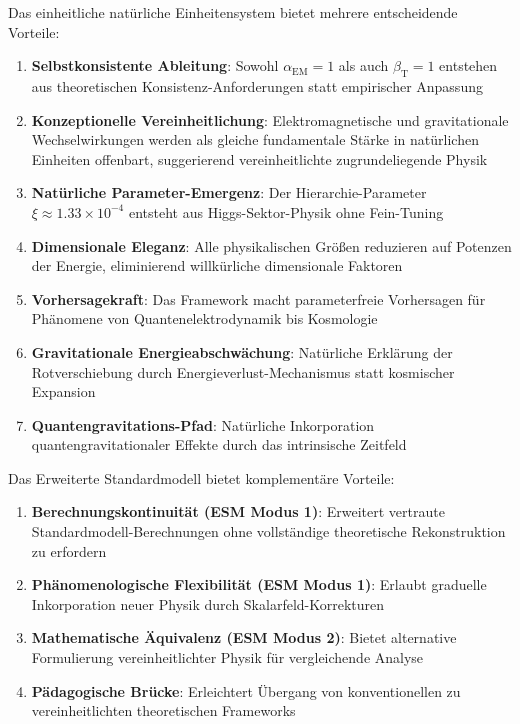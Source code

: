 \documentclass[12pt,a4paper]{article}
\newcommand{\alphaEM}{\alpha_{\text{EM}}}
\newcommand{\betaT}{\beta_{\text{T}}}
\newcommand{\xipar}{\xi}
\begin{document}
	Das einheitliche natürliche Einheitensystem bietet mehrere entscheidende Vorteile:
	
	\begin{enumerate}
		\item \textbf{Selbstkonsistente Ableitung}: Sowohl $\alphaEM = 1$ als auch $\betaT = 1$ entstehen aus theoretischen Konsistenz-Anforderungen statt empirischer Anpassung
		
		\item \textbf{Konzeptionelle Vereinheitlichung}: Elektromagnetische und gravitationale Wechselwirkungen werden als gleiche fundamentale Stärke in natürlichen Einheiten offenbart, suggerierend vereinheitlichte zugrundeliegende Physik
		
		\item \textbf{Natürliche Parameter-Emergenz}: Der Hierarchie-Parameter $\xipar \approx 1.33 \times 10^{-4}$ entsteht aus Higgs-Sektor-Physik ohne Fein-Tuning
		
		\item \textbf{Dimensionale Eleganz}: Alle physikalischen Größen reduzieren auf Potenzen der Energie, eliminierend willkürliche dimensionale Faktoren
		
		\item \textbf{Vorhersagekraft}: Das Framework macht parameterfreie Vorhersagen für Phänomene von Quantenelektrodynamik bis Kosmologie
		
		\item \textbf{Gravitationale Energieabschwächung}: Natürliche Erklärung der Rotverschiebung durch Energieverlust-Mechanismus statt kosmischer Expansion
		
		\item \textbf{Quantengravitations-Pfad}: Natürliche Inkorporation quantengravitationaler Effekte durch das intrinsische Zeitfeld
	\end{enumerate}
	
	Das Erweiterte Standardmodell bietet komplementäre Vorteile:
	
	\begin{enumerate}
		\item \textbf{Berechnungskontinuität (ESM Modus 1)}: Erweitert vertraute Standardmodell-Berechnungen ohne vollständige theoretische Rekonstruktion zu erfordern
		
		\item \textbf{Phänomenologische Flexibilität (ESM Modus 1)}: Erlaubt graduelle Inkorporation neuer Physik durch Skalarfeld-Korrekturen
		
		\item \textbf{Mathematische Äquivalenz (ESM Modus 2)}: Bietet alternative Formulierung vereinheitlichter Physik für vergleichende Analyse
		
		\item \textbf{Pädagogische Brücke}: Erleichtert Übergang von konventionellen zu vereinheitlichten theoretischen Frameworks
	\end{enumerate}
	
\end{document}
